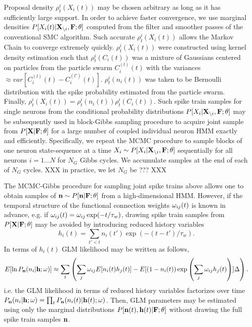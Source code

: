 Proposal density $\rho^i_t(X_i(t))$ may be chosen arbitrary as long as it has sufficiently large support.  In order to achieve faster convergence, we use marginal densities $P[X_i(t)|{\bf X}_{\backslash i}, \bf F; \theta]$ computed from the filter and smoother passes of the conventional SMC algorithm. Such accurate $\rho^i_t(X_i(t))$ allows the Markov Chain to converge extremely quickly.  $\rho^i_t(X_i(t))$ were constructed using kernel density estimation such that $\rho^i_t(C_i(t))$ was a mixture of Gaussians centered on particles from the particle swarm $C_i^{(l)}(t)$ with the variances $\approx var\left[C_i^{(l)}(t)-C_i^{(l')}(t) \right]$. $\rho^i_t(n_i(t))$ was taken to be Bernoulli distribution with the spike probability estimated from the particle swarm. Finally, $\rho^i_t(X_i(t)) = \rho^i_t(n_i(t)) \rho^i_t(C_i(t))$.  Such spike train samples for single neurons from the conditional probability distributions $P[X_i|{\bf X}_{\backslash i}, \bf F; \theta]$ may be subsequently used in block-Gibbs sampling procedure to acquire joint sample from $P[{\bf X}| {\bf F}; \theta]$ for a large number of coupled individual neuron HMM exactly and efficiently.  Specifically, we repeat the MCMC procedure to sample blocks of one neuron state-sequence at a time $X_i\sim P[X_{i}|{\bf X}_{\backslash i},{\bf F}; \theta]$ sequentially for all neurons $i=1\ldots N$ for $N_G$ Gibbs cycles.  We accumulate samples at the end of each of $N_G$ cycles.  XXX in practice, we let $N_G$ be ??? XXX

The MCMC-Gibbs procedure for sampling joint spike trains above allows one to obtain samples of ${\bf n}\sim P[{\bf n}|{\bf F}; \mathbf{\theta}]$ from a high-dimensional HMM. However, if the temporal structure of the functional connection weights $\omega_{ij}(t)$ is known in advance, e.g. if $\omega_{ij}(t)=\omega_{ij}\exp(-t/\tau_w)$, drawing spike train samples from $P[{\bf X}|{\bf F};\mathbf{\theta}]$ may be avoided by introducing reduced history variables 
\begin{equation}
h_i(t)=\sum\limits_{t'<t} n_i(t')\exp(-(t-t')/\tau_w).
\end{equation}
In terms of $h_i(t)$ GLM likelihood may be written as follows, 
\begin{equation}
E[\ln P_{{\bf n}}(n_i|{\bf h}; \mathbf{\omega})]\approx \sum_t \left(\sum\limits_{j} \omega_{ij} E[n_i(t) h_j(t)] -
E[(1-n_i(t)) \exp\left(\sum\limits_j \omega_{ij}h_j(t)\right)] \Delta \right). 
\end{equation}
i.e. the GLM likelihood in terms of reduced history variables factorizes over time $P_{{\bf n}}(n_i|{\bf h};\mathbf{\omega})=\prod_t P_{{\bf n}}(n_i(t)|{\bf h}(t);\mathbf{\omega})$.
Then, GLM parameters may be estimated using only the marginal distributions $P[{\bf n}(t), {\bf h}(t)|{\bf F};\mathbf{\theta}]$ without drawing the full spike train samples ${\bf n}$.

